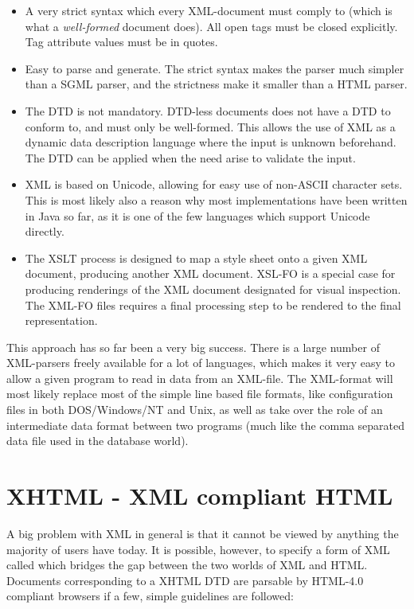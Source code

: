 \begin{itemize}

\item A very strict syntax which every XML-document must comply to
(which is what a \emph{well-formed} document does).  All open tags
must be closed explicitly.  Tag attribute values must be in quotes.
  
\item Easy to parse and generate.  The strict syntax makes the parser
much simpler than a SGML parser, and the strictness make it smaller
than a HTML parser.

\item The DTD is not mandatory.  DTD-less documents does not have a
  DTD to conform to, and must only be well-formed.  This allows the
  use of XML as a dynamic data description language where the input is
  unknown beforehand.  The DTD can be applied when the need arise to
  validate the input.

\item
  XML is based on Unicode, allowing for easy use of non-ASCII
  character sets.  This is most likely also a reason why most
  implementations have been written in Java so far, as it is one of
  the few languages which support Unicode directly.
  
\item The XSLT process is designed to map a style sheet onto a given
  XML document, producing another XML document.  XSL-FO is a special
  case for producing renderings of the XML document designated for
  visual inspection.  The XML-FO files requires a final processing
  step to be rendered to the final representation.
\end{itemize}

This approach has so far been a very big success.  There is a large
number of XML-parsers freely available for a lot of languages, which
makes it very easy to allow a given program to read in data from an
XML-file.   The XML-format will most likely replace most of the simple
line based file formats, like configuration files in both
DOS/Windows/NT and Unix, as well as take over the role of an
intermediate data format between two programs (much like the comma
separated data file used in the database world).

\section{XHTML - XML compliant HTML}

A big problem with XML in general is that it cannot be viewed by
anything the majority of users have today.  It is possible, however,
to specify a form of XML called
 which bridges the gap
between the two worlds of XML and HTML.  Documents corresponding to a
XHTML DTD are parsable by HTML-4.0 compliant browsers if a few, simple
guidelines are followed:

